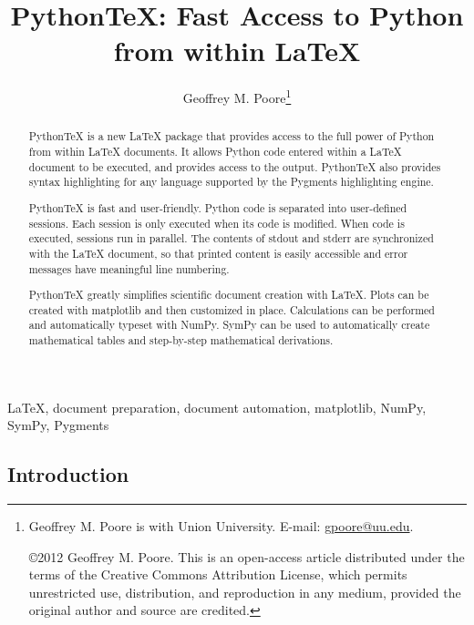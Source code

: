 \documentclass[letterpaper,compsoc,twoside]{IEEEtran}
\begin{document}
\title{PythonTeX:  Fast Access to Python from within LaTeX}\author{Geoffrey M. Poore\thanks{Geoffrey M. Poore is with Union University. E-mail: \protect\href{mailto:gpoore@uu.edu}{gpoore@uu.edu}.

\noindent \copyright 2012 Geoffrey M. Poore. This is an open-access article distributed under the terms of the Creative Commons Attribution License, which permits unrestricted use, distribution, and reproduction in any medium, provided the original author and source are credited.
        }}\maketitle
        \renewcommand{\leftmark}{PROC. OF THE 11th PYTHON IN SCIENCE CONF. (SCIPY 2012)}
        \renewcommand{\rightmark}{PYTHONTEX:  FAST ACCESS TO PYTHON FROM WITHIN LATEX}
        


\newcommand*{\docutilsroleref}{\ref}
\newcommand*{\docutilsrolelabel}{\label}
\begin{abstract}PythonTeX is a new LaTeX package that provides access
to the full power of Python from within LaTeX documents. It allows
Python code entered within a LaTeX document to be executed, and provides
access to the output. PythonTeX also provides syntax highlighting for
any language supported by the Pygments highlighting engine.

PythonTeX is fast and user-friendly. Python code is separated into
user-defined sessions.  Each session is only executed when its code
is modified. When code is executed, sessions run in parallel. The
contents of stdout and stderr are synchronized with the LaTeX document,
so that printed content is easily accessible and error messages have
meaningful line numbering.

PythonTeX greatly simplifies scientific document creation with LaTeX.
Plots can be created with matplotlib and then customized in place.
Calculations can be performed and automatically typeset with NumPy.
SymPy can be used to automatically create mathematical tables and
step-by-step mathematical derivations.\end{abstract}\begin{IEEEkeywords}LaTeX, document preparation, document automation,
matplotlib, NumPy, SymPy, Pygments\end{IEEEkeywords}

\subsection{Introduction%
  \label{introduction}%
}
\end{document}
